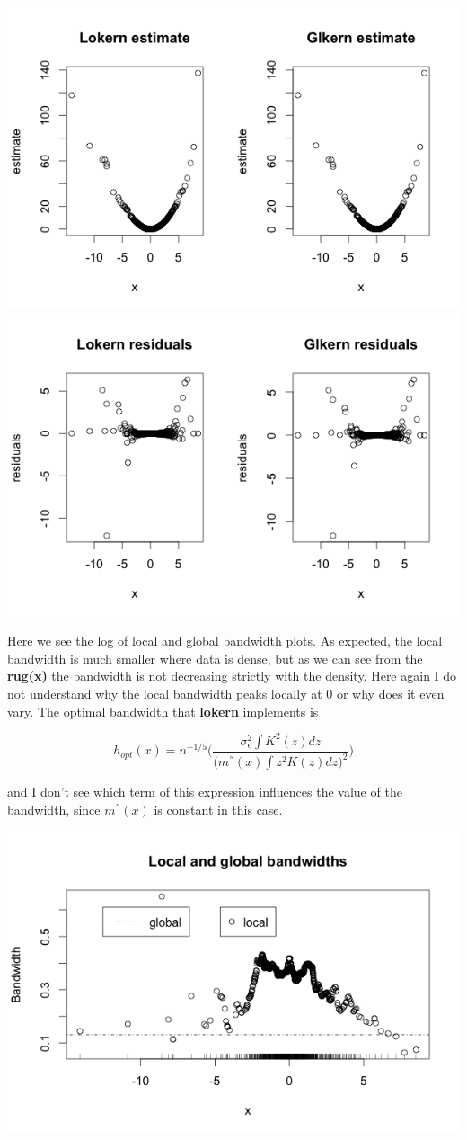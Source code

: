 \documentclass[a4paper,12pt]{article}
\begin{document}
\includegraphics[scale = 0.7]{hmw4_plot4.png}
\includegraphics[scale = 0.6]{hmw4_plot5.png}

Here we see the log of local and global bandwidth plots. As expected, the local bandwidth is much smaller where data is dense, but as we can see from the \textbf{rug(x)} the bandwidth is not decreasing strictly with the density. Here again I do not understand why the local bandwidth peaks locally at 0 or why does it even vary. The optimal bandwidth that \textbf{lokern} implements is

\begin{equation}
h_{opt}(x) = n^{-1/5}\Bigg( \frac{\sigma_\epsilon^2 \int{K^2(z)dz}}{\big( m^{''}(x)\int{z^2K(z)dz} \big)^2} \Bigg)
\end{equation}

and I don't see which term of this expression influences the value of the bandwidth, since $m^{''}(x)$ is constant in this case.


\includegraphics[scale = 0.65]{hmw4_plot6.png}
\end{document}
